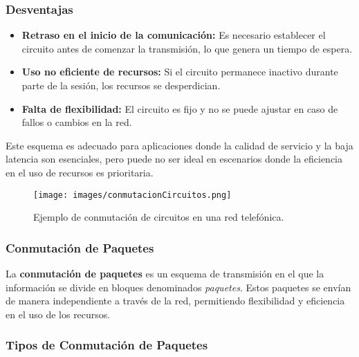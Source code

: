 \documentclass[a4paper,12pt]{article}
\begin{document}
\subsubsection*{Desventajas}

\begin{itemize}
    \item \textbf{Retraso en el inicio de la comunicación:} Es necesario establecer el circuito antes de comenzar la transmisión, lo que genera un tiempo de espera.
    \item \textbf{Uso no eficiente de recursos:} Si el circuito permanece inactivo durante parte de la sesión, los recursos se desperdician.
    \item \textbf{Falta de flexibilidad:} El circuito es fijo y no se puede ajustar en caso de fallos o cambios en la red.
\end{itemize}

Este esquema es adecuado para aplicaciones donde la calidad de servicio y la baja latencia son esenciales, pero puede no ser ideal en escenarios donde la eficiencia en el uso de recursos es prioritaria.

\begin{figure}[H]
    \centering
    \texttt{[image: images/conmutacionCircuitos.png]}
    \caption{Ejemplo de conmutación de circuitos en una red telefónica.}
\end{figure}

\subsubsection{Conmutación de Paquetes}

La \textbf{conmutación de paquetes} es un esquema de transmisión en el que la información se divide en bloques denominados \textit{paquetes}. Estos paquetes se envían de manera independiente a través de la red, permitiendo flexibilidad y eficiencia en el uso de los recursos. 

\subsubsection*{Tipos de Conmutación de Paquetes}
\end{document}
